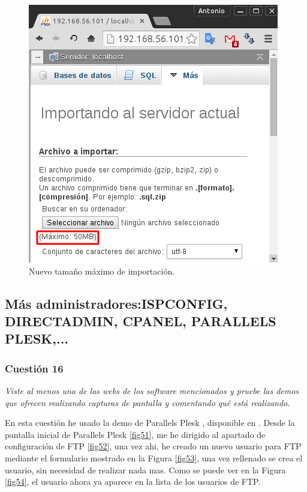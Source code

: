 \begin{figure}[H]
    \begin{center}
        \includegraphics[scale=0.5]{imagenes/img38}
        \caption{Nuevo tamaño máximo de importación.}
        \label{fig35}
    \end{center}
\end{figure}

\subsection{Más administradores:ISPCONFIG, DIRECTADMIN, CPANEL, PARALLELS PLESK,... }
\subsubsection{Cuestión 16}
\textit{Viste al menos una de las webs de los software mencionados y pruebe las demos que ofrecen realizando capturas de pantalla y comentando qué está realizando.}

En esta cuestión he usado la demo de Parallels Plesk , disponible en \cite{pp}. Desde la pantalla inicial de Parallels Plesk \ref{fig51}, me he dirigido al apartado de configuración de FTP \ref{fig52}, una vez ahi, he creado un nuevo usuario para FTP mediante el formulario mostrado en la Figura \ref{fig53}, una vez rellenado se crea el usuario, sin necesidad de realizar nada mas. Como se puede ver en la Figura \ref{fig54}, el usuario ahora ya aparece en la lista de los usuarios de FTP.

